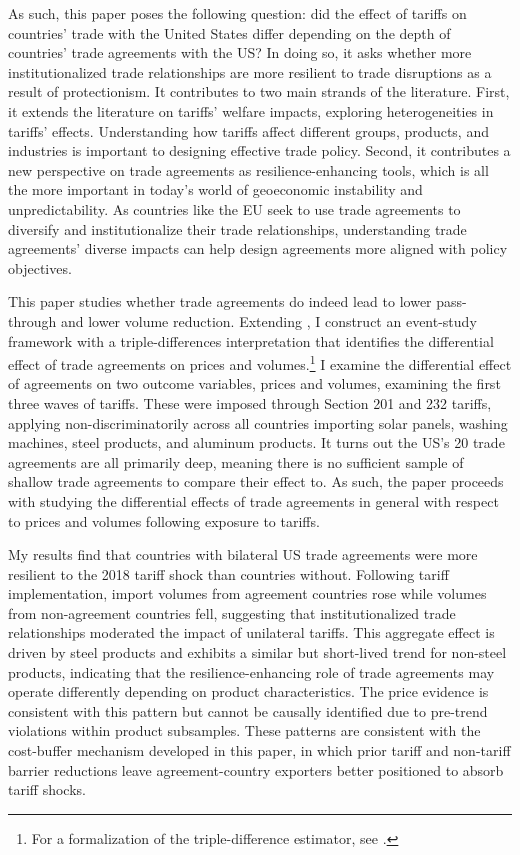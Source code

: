 As such, this paper poses the following question: did the effect of tariffs on countries' trade with the United States differ depending on the depth of countries' trade agreements with the US? In doing so, it asks whether more institutionalized trade relationships are more resilient to trade disruptions as a result of protectionism. It contributes to two main strands of the literature. First, it extends the literature on tariffs' welfare impacts, exploring heterogeneities in tariffs' effects. Understanding how tariffs affect different groups, products, and industries is important to designing effective trade policy. Second, it contributes a new perspective on trade agreements as resilience-enhancing tools, which is all the more important in today's world of geoeconomic instability and unpredictability. As countries like the EU seek to use trade agreements to diversify and institutionalize their trade relationships, understanding trade agreements' diverse impacts can help design agreements more aligned with policy objectives. 

This paper studies whether trade agreements do indeed lead to lower pass-through and lower volume reduction. Extending \textcite{amiti_whos_2020}, I construct an event-study framework with a triple-differences interpretation that identifies the differential effect of trade agreements on prices and volumes.\footnote{For a formalization of the triple-difference estimator, see \textcite{oldenTripleDifferenceEstimator2022}.} I examine the differential effect of agreements on two outcome variables, prices and volumes, examining the first three waves of tariffs. These were imposed through Section 201 and 232 tariffs, applying non-discriminatorily across all countries importing solar panels, washing machines, steel products, and aluminum products. It turns out the US's 20 trade agreements are all primarily deep, meaning there is no sufficient sample of shallow trade agreements to compare their effect to. As such, the paper proceeds with studying the differential effects of trade agreements in general with respect to prices and volumes following exposure to tariffs. 

My results find that countries with bilateral US trade agreements were more resilient to the 2018 tariff shock than countries without. Following tariff implementation, import volumes from agreement countries rose while volumes from non-agreement countries fell, suggesting that institutionalized trade relationships moderated the impact of unilateral tariffs. This aggregate effect is driven by steel products and exhibits a similar but short-lived trend for non-steel products, indicating that the resilience-enhancing role of trade agreements may operate differently depending on product characteristics. The price evidence is consistent with this pattern but cannot be causally identified due to pre-trend violations within product subsamples. These patterns are consistent with the cost-buffer mechanism developed in this paper, in which prior tariff and non-tariff barrier reductions leave agreement-country exporters better positioned to absorb tariff shocks.

